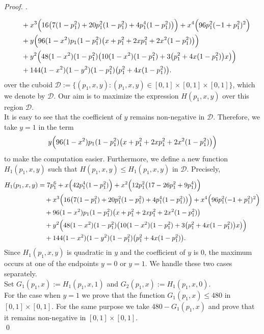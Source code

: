 \documentclass[a4paper,12pt,reqno]{amsart} %
\numberwithin{equation}{section}
\theoremstyle{definition}
\newenvironment{pf}[1][]{%
	\vskip 3mm
	\noindent
	\ifthenelse{\equal{#1}{}}%
	{{\slshape Proof. }}%
	{{\slshape #1.} }%
}%
{\qed\bigskip}
\begin{document}
\begin{pf}
\begin{align}
&\quad
+ x^{3}\Bigl(16\bigl(7(1-p_1^{2})+20p_1^{2}(1-p_1^{2})+4p_1^{4}(1-p_1^{2})\bigr)\Bigr)
+ x^{4}\Bigl(96p_1^{2}(-1+p_1^{2})^{2}\Bigr)\notag\\
&\quad
+ y\Bigl(96(1-x^{2})p_1(1-p_1^{2})\bigl(x+p_1^{2}+2xp_1^{2}+2x^{2}(1-p_1^{2})\bigr)\Bigr)\notag\\
&\quad
+ y^{2}\Bigl(48(1-x^{2})(1-p_1^{2})\bigl(10(1-x^{2})(1-p_1^{2})
+3\bigl(p_1^{2}+4x(1-p_1^{2})\bigr)x\bigr)\Bigr)\notag\\
&\quad
+ 144(1-x^{2})(1-y^{2})(1-p_1^{2})\bigl(p_1^{2}+4x(1-p_1^{2})\bigr).
\end{align}
over the cuboid $\mathcal{D}:=\{(p_1, x, y):(p_1, x, y)\in [0, 1] \times [0, 1] \times [0, 1]\}$, which we denote by $\mathcal{D}$. Our aim is to maximize the expression $H(p_1, x, y)$ over this region $\mathcal{D}$.\\[2mm]
It is easy to see that the coefficient of $y$ remains non-negative in $\mathcal{D}$. Therefore, we take $y=1$ in the term
\[
y\Bigl(96(1-x^{2})p_1(1-p_1^{2})\bigl(x+p_1^{2}+2xp_1^{2}+2x^{2}(1-p_1^{2})\bigr)\Bigr)
\]
to make the computation easier. Furthermore, we define a new function $H_{1}(p_1, x, y)$ such that $H(p_1, x, y) \leq H_{1}(p_1, x, y)$ in $\mathcal{D}$. Precisely,
\begin{align}\label{eq:3.24}
H_1(p_1,x,y)
&= 7p_1^{6}
+ x\Bigl(42p_1^{4}(1-p_1^{2})\Bigr)
+ x^{2}\Bigl(12p_1^{2}\bigl(17-26p_1^{2}+9p_1^{4}\bigr)\Bigr)\notag\\
&\quad
+ x^{3}\Bigl(16\bigl(7(1-p_1^{2})+20p_1^{2}(1-p_1^{2})+4p_1^{4}(1-p_1^{2})\bigr)\Bigr)
+ x^{4}\Bigl(96p_1^{2}(-1+p_1^{2})^{2}\Bigr)\notag\\
&\quad
+ 96(1-x^{2})p_1(1-p_1^{2})\bigl(x+p_1^{2}+2xp_1^{2}+2x^{2}(1-p_1^{2})\bigr)\notag\\
&\quad
+ y^{2}\Bigl(48(1-x^{2})(1-p_1^{2})\bigl(10(1-x^{2})(1-p_1^{2})
+3\bigl(p_1^{2}+4x(1-p_1^{2})\bigr)x\bigr)\Bigr)\notag\\
&\quad
+ 144(1-x^{2})(1-y^{2})(1-p_1^{2})\bigl(p_1^{2}+4x(1-p_1^{2})\bigr).
\end{align}
Since $H_{1}(p_{1}, x, y)$ is quadratic in $y$ and the coefficient of $y$ is $0$, the maximum occurs at one of the endpoints $y=0$ or $y=1$. We handle these two cases separately.\\[2mm]
Set $G_{1}(p_1, x):=H_{1}(p_{1}, x, 1)$ and $G_{2}(p_1, x):=H_{1}(p_{1}, x, 0)$. \\[2mm]
For the case when $y=1$ we prove that the function $G_{1}(p_1, x)\le 480$ in $[0, 1]\times[0, 1]$. For the same purpose we take $480-G_{1}(p_{1}, x)$ and prove that it remains non-negative in $[0, 1] \times[0, 1]$.\\

\end{pf}
\end{document}
